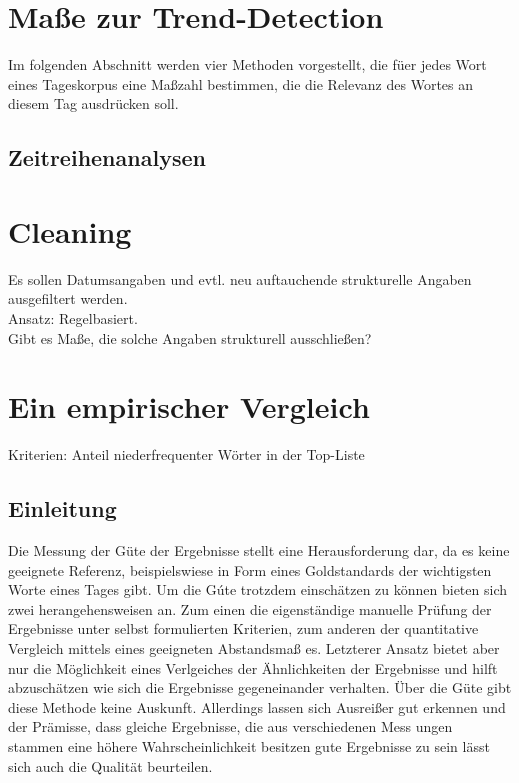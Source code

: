 \chapter{Maße zur Trend-Detection}
Im folgenden Abschnitt werden vier Methoden vorgestellt, die füer jedes Wort eines Tageskorpus eine Maßzahl bestimmen, die die Relevanz des Wortes an diesem Tag ausdrücken soll.





\section{Zeitreihenanalysen}

\chapter{Cleaning}
Es sollen Datumsangaben und evtl. neu auftauchende strukturelle Angaben ausgefiltert werden.\\
Ansatz: Regelbasiert.\\
Gibt es Maße, die solche Angaben strukturell ausschließen?






\chapter{Ein empirischer Vergleich}
 
Kriterien: Anteil niederfrequenter Wörter in der Top-Liste\\
\section{Einleitung}
Die Messung der Güte der Ergebnisse stellt eine Herausforderung dar, da es keine geeignete Referenz, beispielswiese in Form eines Goldstandards der wichtigsten Worte eines Tages gibt. Um die G\'ute trotzdem einschätzen zu können bieten sich zwei herangehensweisen an. Zum einen die eigenständige manuelle Prüfung der Ergebnisse unter selbst formulierten Kriterien, zum anderen der quantitative Vergleich mittels eines geeigneten Abstandsmaß es. Letzterer Ansatz bietet aber nur die Möglichkeit eines Verlgeiches der Ähnlichkeiten der Ergebnisse und hilft abzuschätzen wie sich die Ergebnisse gegeneinander verhalten. Über die Güte gibt diese Methode keine Auskunft. Allerdings lassen sich Ausreißer gut erkennen und der Prämisse, dass gleiche Ergebnisse, die aus verschiedenen Mess ungen stammen eine höhere Wahrscheinlichkeit besitzen gute Ergebnisse zu sein lässt sich auch die Qualität beurteilen.
